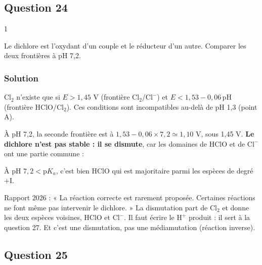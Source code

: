 \documentclass[11pt,a4paper]{article}
\newcommand{\equationajustee}[1]{%
  \sbox{\boiteequation}{$\displaystyle #1$}%
  \ifdim\wd\boiteequation>\linewidth
    \[\resizebox{\linewidth}{!}{\usebox{\boiteequation}}\]%
  \else
    \[#1\]%
  \fi}
\begin{document}
\hypertarget{question-24}{%
\subsection{Question 24}\label{question-24}}

\begin{indication}{1}

Le dichlore est l'oxydant d'un couple et le réducteur d'un autre. Comparer les deux frontières à pH 7,2.

\end{indication}

\hypertarget{solution-23}{%
\subsubsection{Solution}\label{solution-23}}

\(\mathrm{Cl_2}\) n'existe que si \(E>1{,}45\) V (frontière \(\mathrm{Cl_2/Cl^-}\)) et \(E<1{,}53-0{,}06\,\mathrm{pH}\) (frontière \(\mathrm{HClO/Cl_2}\)). Ces conditions sont incompatibles au-delà de pH 1,3 (point A).

À pH 7,2, la seconde frontière est à \(1{,}53-0{,}06\times7{,}2\simeq1{,}10\) V, sous 1,45 V. \textbf{Le dichlore n'est pas stable : il se dismute}, car les domaines de \(\mathrm{HClO}\) et de \(\mathrm{Cl^-}\) ont une partie commune :

\equationajustee{\boxed{\mathrm{Cl_2}+\mathrm{H_2O}\longrightarrow\mathrm{HClO}+\mathrm{Cl^-}+\mathrm{H^+}}}

À pH \(7{,}2<\mathrm pK_a\), c'est bien \(\mathrm{HClO}\) qui est majoritaire parmi les espèces de degré +I.

\begin{piege}

Rapport 2026 : « La réaction correcte est rarement proposée. Certaines réactions ne font même pas intervenir le dichlore. » La dismutation part de \(\mathrm{Cl_2}\) et donne les deux espèces voisines, \(\mathrm{HClO}\) et \(\mathrm{Cl^-}\). Il faut écrire le \(\mathrm{H^+}\) produit : il sert à la question 27. Et c'est une dismutation, pas une médiamutation (réaction inverse).

\end{piege}

\hypertarget{question-25}{%
\subsection{Question 25}\label{question-25}}
\end{document}
